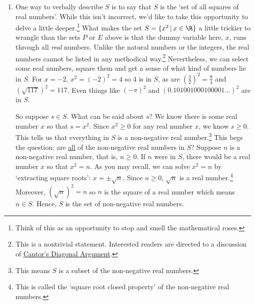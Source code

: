 \begin{ex}
\begin{enumerate}
Proceeding in the same way, we generate elements in $E = \{ 2n \, | \, n \in \mathbb Z \}$ by plugging in integer values of $n$ into the formula $2n$.  Starting with $n = 0$ we obtain $2(0) = 0$.  For $n = 1$ we get $2(1) = 2$, for $n = -1$ we get $2(-1) = -2$ for $n = 2$, we get $2(2) = 4$ and for $n = -2$ we get $2(-2) = -4$.  As $n$  moves through the integers, $2n$ produces all of the \textit{even} integers.\footnote{This shouldn't be too surprising, since an even integer is \textit{defined} to be an integer multiple of $2$.} A roster description for  $E$ is $E = \{ 0, \pm 2, \pm 4, \ldots \}$.

\item  One way to verbally describe $S$ is to say that $S$ is the `set of all squares of real numbers'.  While this isn't incorrect, we'd like to take this opportunity to delve a little deeper.\footnote{Think of this as an opportunity to stop and smell the mathematical roses.}  What makes the set $S = \{ x^2 \, | \, x \in \R \}$ a little trickier to wrangle than the sets $P$ or $E$ above is that the dummy variable here, $x$, runs through all \textit{real} numbers.  Unlike the natural numbers or the integers, the real numbers cannot be listed in any methodical way.\footnote{This is a nontrivial statement.  Interested readers are directed to a discussion of \href{http://en.wikipedia.org/wiki/Cantor's_diagonal_argument}{\underline{Cantor's Diagonal Argument}}.}  Nevertheless, we can select some real numbers, square them and get a sense of what kind of numbers lie in $S$.  For $x = -2$, $x^2 = (-2)^2 = 4$ so $4$ is in $S$, as are $\left(\frac{3}{2}\right)^2 = \frac{9}{4}$ and $(\sqrt{117})^2 = 117$.  Even things like $(-\pi)^2$ and $(0.101001000100001 \ldots)^2$ are in $S$.  

So suppose $s \in S$.  What can be said about $s$?  We know there is some real number $x$ so that $s = x^2$.  Since $x^2 \geq 0$ for any real number $x$, we know $s \geq 0$.  This tells us that everything in $S$ is a non-negative real number.\footnote{This means $S$ is a subset of the non-negative real numbers.}  This begs the question:  are \underline{all} of the non-negative real numbers in $S$?  Suppose $n$ is a non-negative real number, that is, $n \geq 0$.  If $n$ were in $S$, there would be a real number $x$ so that $x^2=n$.  As you may recall, we can solve $x^2 = n$ by `extracting square roots':  $x = \pm \sqrt{n}$.  Since $n \geq 0$, $\sqrt{n}$ is a real number.\footnote{This is called the `square root closed property' of the non-negative real numbers.}  Moreover, $(\sqrt{n})^2 = n$ so $n$ is the square of a real number which means $n \in S$. Hence, $S$ is the set of non-negative real numbers.


\end{enumerate}
\end{ex}
